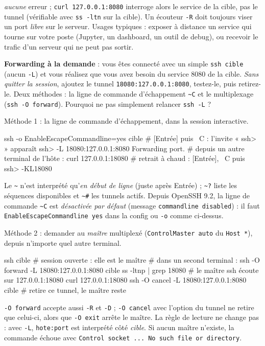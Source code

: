 \documentclass[a4paper,10pt]{exam}
\begin{document}
\begin{questions}
\begin{solution}
\emph{aucune} erreur ; \texttt{curl 127.0.0.1:8080} interroge alors le service de la
cible, pas le tunnel (vérifiable avec \texttt{ss -ltn} sur la cible). Un écouteur
\texttt{-R} doit toujours viser un port \emph{libre} sur le serveur.
Usages typiques : exposer à distance un service qui tourne sur votre poste (Jupyter, un
dashboard, un outil de debug), ou recevoir le trafic d'un serveur qui ne peut pas sortir.
\end{solution}
\question \textbf{Forwarding à la demande} : vous êtes connecté avec un simple
\texttt{ssh cible} (aucun \texttt{-L}) et vous réalisez que vous avez besoin du service
8080 de la cible. \emph{Sans quitter la session}, ajoutez le tunnel
\texttt{18080:127.0.0.1:8080}, testez-le, puis retirez-le. Deux méthodes : la ligne de
commande d'échappement \texttt{\textasciitilde C} et le multiplexage
(\texttt{ssh -O forward}). Pourquoi ne pas simplement relancer \texttt{ssh -L} ?
\begin{solution}
Méthode 1 : la ligne de commande d'échappement, dans la session interactive.
\begin{bashcode}
ssh -o EnableEscapeCommandline=yes cible
# [Entrée] puis ~C : l'invite « ssh> » apparaît
ssh> -L 18080:127.0.0.1:8080
Forwarding port.
# depuis un autre terminal de l'hôte :
curl 127.0.0.1:18080
# retrait à chaud : [Entrée], ~C puis
ssh> -KL18080
\end{bashcode}
Le \texttt{\textasciitilde} n'est interprété qu'\emph{en début de ligne} (juste après
Entrée) ; \texttt{\textasciitilde ?} liste les séquences disponibles et
\texttt{\textasciitilde \#} les tunnels actifs. Depuis OpenSSH 9.2, la ligne de commande
\texttt{\textasciitilde C} est \emph{désactivée par défaut} (message
\texttt{commandline disabled}) : il faut \texttt{EnableEscapeCommandline yes} dans la
config ou \texttt{-o} comme ci-dessus.

Méthode 2 : demander au \emph{maître} multiplexé (\texttt{ControlMaster auto} du
\texttt{Host *}), depuis n'importe quel autre terminal.
\begin{bashcode}
ssh cible                      # session ouverte : elle est le maître
# dans un second terminal :
ssh -O forward -L 18080:127.0.0.1:8080 cible
ss -ltnp | grep 18080          # le maître ssh écoute sur 127.0.0.1:18080
curl 127.0.0.1:18080
ssh -O cancel -L 18080:127.0.0.1:8080 cible   # retire ce tunnel, le maître reste
\end{bashcode}
\texttt{-O forward} accepte aussi \texttt{-R} et \texttt{-D} ; \texttt{-O cancel} avec
l'option du tunnel ne retire que celui-ci, alors que \texttt{-O exit} arrête le maître.
La règle de lecture ne change pas : avec \texttt{-L}, \texttt{hote:port} est interprété
côté \emph{cible}. Si aucun maître n'existe, la commande échoue avec
\texttt{Control socket ... No such file or directory}.


\end{solution}
\end{questions}
\end{document}
